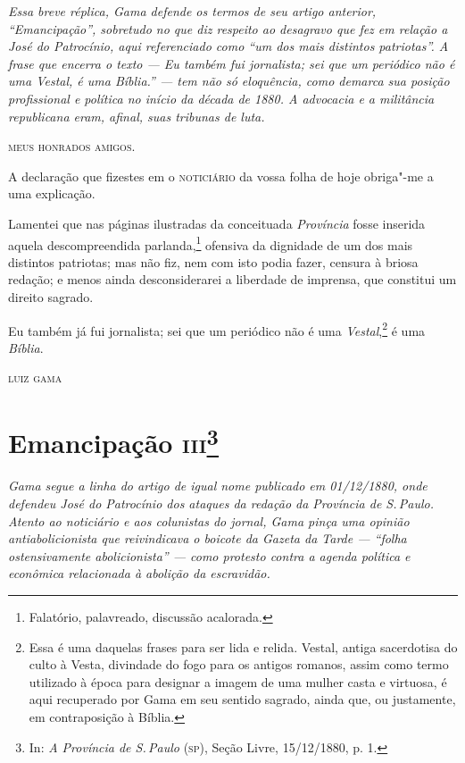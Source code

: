 \begin{flushleft}
{\footnotesize\itshape
Essa breve réplica, Gama defende os termos de seu artigo anterior,
``Emancipação'', sobretudo no que diz respeito ao desagravo que fez em
relação a José do Patrocínio, aqui referenciado como ``um dos mais
distintos patriotas''. A frase que encerra o texto --- Eu também fui
jornalista; sei que um periódico não é uma Vestal, é uma Bíblia.'' --- tem
não só eloquência, como demarca sua posição profissional e política no
início da década de 1880. A advocacia e a militância republicana eram,
afinal, suas tribunas de luta.}
\end{flushleft}

\textsc{meus honrados amigos.}

A declaração que fizestes em o \textsc{noticiário} da vossa folha de hoje
obriga"-me a uma explicação.

Lamentei que nas páginas ilustradas da conceituada \emph{Província}
fosse inserida aquela descompreendida parlanda,\footnote{Falatório,
  palavreado, discussão acalorada.} ofensiva da dignidade de um dos mais
distintos patriotas; mas não fiz, nem com isto podia fazer, censura à
briosa redação; e menos ainda desconsiderarei a liberdade de imprensa,
que constitui um direito sagrado.

Eu também já fui jornalista; sei que um periódico não é uma
\emph{Vestal},\footnote{Essa é uma daquelas frases para ser lida e relida.
  Vestal, antiga sacerdotisa do culto à Vesta, divindade do fogo para os
  antigos romanos, assim como termo utilizado à época para designar a
  imagem de uma mulher casta e virtuosa, é aqui recuperado por Gama em
  seu sentido sagrado, ainda que, ou justamente, em contraposição à
  Bíblia.} é uma
\emph{Bíblia}.

\bigskip

\hfill\textsc{luiz gama}


\chapter{Emancipação \textsc{iii}\footnote[*]{In: \emph{A Província de
  S.\,Paulo} (\textsc{sp}), Seção Livre, 15/12/1880, p. 1.}}

\begin{flushleft}
{\footnotesize\itshape
Gama segue a linha do artigo de igual nome publicado em
01/12/1880, onde defendeu José do Patrocínio dos ataques da redação da
Província de S.\,Paulo. Atento ao noticiário e aos colunistas do jornal,
Gama pinça uma opinião antiabolicionista que reivindicava o boicote da
Gazeta da Tarde --- ``folha ostensivamente abolicionista'' --- como protesto
contra a agenda política e econômica relacionada à abolição da
escravidão.}
\end{flushleft} 

